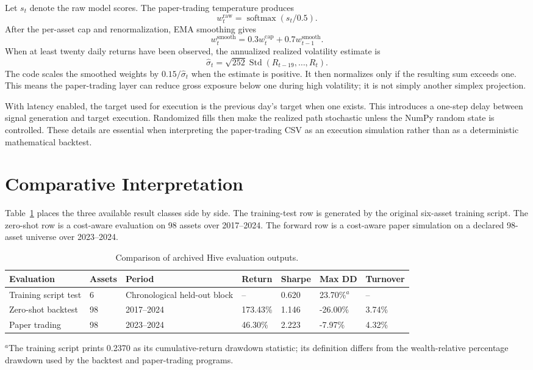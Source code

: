 \documentclass[10pt,a4paper,twocolumn]{article}
\newcommand{\softmax}{\operatorname{softmax}}
\begin{document}
Let $s_t$ denote the raw model scores. The paper-trading temperature produces
\begin{equation}
w_t^{\mathrm{raw}}=\softmax(s_t/0.5).
\end{equation}
After the per-asset cap and renormalization, EMA smoothing gives
\begin{equation}
w_t^{\mathrm{smooth}}=0.3w_t^{\mathrm{cap}}+0.7w_{t-1}^{\mathrm{smooth}}.
\end{equation}
When at least twenty daily returns have been observed, the annualized realized volatility estimate is
\begin{equation}
\widehat{\sigma}_{t}=\sqrt{252}\operatorname{Std}(R_{t-19},\ldots,R_t).
\end{equation}
The code scales the smoothed weights by $0.15/\widehat{\sigma}_t$ when the estimate is positive. It then normalizes only if the resulting sum exceeds one. This means the paper-trading layer can reduce gross exposure below one during high volatility; it is not simply another simplex projection.

With latency enabled, the target used for execution is the previous day's target when one exists. This introduces a one-step delay between signal generation and target execution. Randomized fills then make the realized path stochastic unless the NumPy random state is controlled. These details are essential when interpreting the paper-trading CSV as an execution simulation rather than as a deterministic mathematical backtest.

\section{Comparative Interpretation}
Table~\ref{tab:comparison} places the three available result classes side by side. The training-test row is generated by the original six-asset training script. The zero-shot row is a cost-aware evaluation on 98 assets over 2017--2024. The forward row is a cost-aware paper simulation on a declared 98-asset universe over 2023--2024.

\begin{table}[t]
\centering
\caption{Comparison of archived Hive evaluation outputs.}
\label{tab:comparison}
\small
\begin{tabular}{@{}lllllll@{}}
\toprule
Evaluation & Assets & Period & Return & Sharpe & Max DD & Turnover \\
\midrule
Training script test & 6 & Chronological held-out block & -- & 0.620 & 23.70\%$^a$ & -- \\
Zero-shot backtest & 98 & 2017--2024 & 173.43\% & 1.146 & -26.00\% & 3.74\% \\
Paper trading & 98 & 2023--2024 & 46.30\% & 2.223 & -7.97\% & 4.32\% \\
\bottomrule
\end{tabular}
\vspace{2pt}
\raggedright\footnotesize $^a$The training script prints 0.2370 as its cumulative-return drawdown statistic; its definition differs from the wealth-relative percentage drawdown used by the backtest and paper-trading programs.
\end{table}
\end{document}
